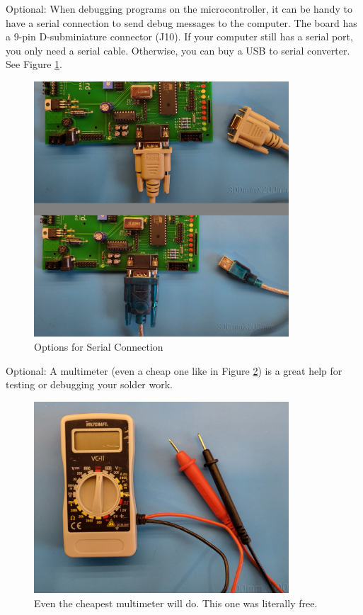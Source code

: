 \documentclass{article}
\begin{document}
Optional: When debugging programs on the microcontroller, it can be handy to have a serial connection to send debug messages to the computer. The board has a 9-pin D-subminiature connector (J10). If your computer still has a serial port, you only need a serial cable. Otherwise, you can buy a USB to serial converter. See Figure \ref{fig:serialOptions}. 
\begin{figure}[htb]
\centering
\includegraphics[width=0.85\textwidth]{Pictures/SerialOptions.jpg}
\caption{Options for Serial Connection}
\label{fig:serialOptions}
\end{figure}

Optional: A multimeter (even a cheap one like in Figure \ref{fig:multimeter}) is a great help for testing or debugging your solder work. 
\begin{figure}[htb]
\centering
\includegraphics[width=0.85\textwidth]{Pictures/Multimeter.jpg}
\caption{Even the cheapest multimeter will do. This one was literally free.}
\label{fig:multimeter}
\end{figure}
\end{document}
